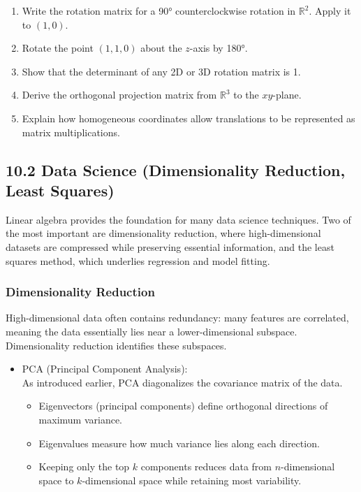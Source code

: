 \documentclass[
  12pt,
  a4paper,
]{article}
\begin{document}
\begin{enumerate}
\def\labelenumi{\arabic{enumi}.}
\item
  Write the rotation matrix for a 90° counterclockwise rotation in
  \(\mathbb{R}^2\). Apply it to \((1,0)\).
\item
  Rotate the point \((1,1,0)\) about the \(z\)-axis by 180°.
\item
  Show that the determinant of any 2D or 3D rotation matrix is 1.
\item
  Derive the orthogonal projection matrix from \(\mathbb{R}^3\) to the
  \(xy\)-plane.
\item
  Explain how homogeneous coordinates allow translations to be
  represented as matrix multiplications.
\end{enumerate}

\subsection{10.2 Data Science (Dimensionality Reduction, Least
Squares)}\label{102-data-science-dimensionality-reduction-least-squares}

Linear algebra provides the foundation for many data science techniques.
Two of the most important are dimensionality reduction, where
high-dimensional datasets are compressed while preserving essential
information, and the least squares method, which underlies regression
and model fitting.

\subsubsection{Dimensionality Reduction}\label{dimensionality-reduction}

High-dimensional data often contains redundancy: many features are
correlated, meaning the data essentially lies near a lower-dimensional
subspace. Dimensionality reduction identifies these subspaces.

\begin{itemize}
\item
  PCA (Principal Component Analysis):\\
  As introduced earlier, PCA diagonalizes the covariance matrix of the
  data.

  \begin{itemize}
  \item
    Eigenvectors (principal components) define orthogonal directions of
    maximum variance.
  \item
    Eigenvalues measure how much variance lies along each direction.
  \item
    Keeping only the top \(k\) components reduces data from
    \(n\)-dimensional space to \(k\)-dimensional space while retaining
    most variability.
  \end{itemize}
\end{itemize}
\end{document}
